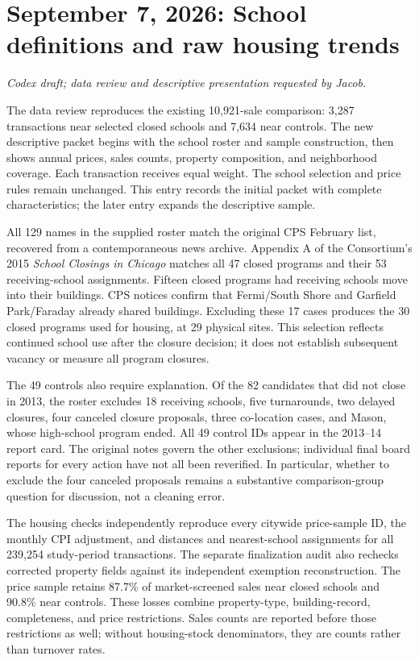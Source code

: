 \section*{September 7, 2026: School definitions and raw housing trends}
\textit{Codex draft; data review and descriptive presentation requested by Jacob.}

The data review reproduces the existing 10,921-sale comparison: 3,287
transactions near selected closed schools and 7,634 near controls. The new
descriptive packet begins with the school roster and sample construction,
then shows annual prices, sales counts, property composition, and neighborhood
coverage. Each transaction receives equal weight. The school selection and
price rules remain unchanged. This entry records the initial packet with
complete characteristics; the later entry expands the descriptive sample.

All 129 names in the supplied roster match the original CPS February list,
recovered from a contemporaneous news archive. Appendix A of the Consortium's
2015 \textit{School Closings in Chicago} matches all 47 closed programs and
their 53 receiving-school assignments. Fifteen closed programs had receiving
schools move into their buildings. CPS notices confirm that Fermi/South Shore
and Garfield Park/Faraday already shared buildings. Excluding these 17 cases
produces the 30 closed programs used for housing, at 29 physical sites.
This selection reflects continued school use after the closure decision;
it does not establish subsequent vacancy or measure all program closures.

The 49 controls also require explanation. Of the 82 candidates that did not
close in 2013, the roster excludes 18 receiving schools, five turnarounds,
two delayed closures, four canceled closure proposals, three co-location
cases, and Mason, whose high-school program ended. All 49 control IDs appear
in the 2013--14 report card. The original notes govern the other exclusions;
individual final board reports for every action have not all been reverified.
In particular, whether to exclude the four canceled proposals remains a
substantive comparison-group question for discussion, not a cleaning error.

The housing checks independently reproduce every citywide price-sample ID,
the monthly CPI adjustment, and distances and nearest-school assignments for
all 239,254 study-period transactions. The separate finalization audit also
rechecks corrected property fields against its independent exemption
reconstruction. The price sample retains 87.7\% of market-screened sales near
closed schools and 90.8\% near controls. These losses combine property-type,
building-record, completeness, and price restrictions. Sales counts are reported
before those restrictions as well; without housing-stock denominators, they
are counts rather than turnover rates.

